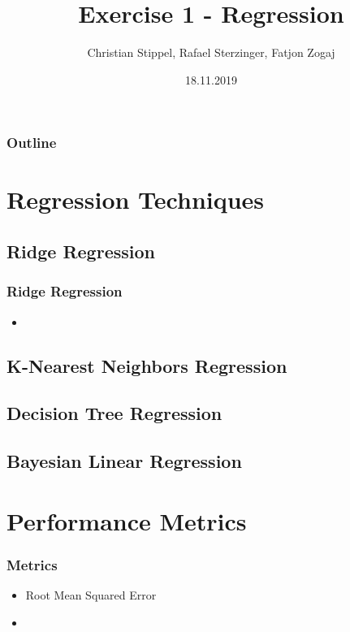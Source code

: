 \documentclass[aspectratio=169]{beamer}
\title[Your Short Title]{Exercise 1 - Regression}
\author{Christian Stippel, Rafael Sterzinger, Fatjon Zogaj}
\institute{Machine Learning}
\date{18.11.2019}
\begin{document}

\begin{frame}
  \titlepage
\end{frame}

\begin{frame}
\frametitle{Outline}
\tableofcontents
\end{frame}

\section{Regression Techniques}
\subsection{Ridge Regression}

\begin{frame}
\frametitle{Ridge Regression}
\begin{itemize}
\item 
\end{itemize}
\end{frame}

\subsection{K-Nearest Neighbors Regression}
\subsection{Decision Tree Regression}
\subsection{Bayesian Linear Regression}

\section{Performance Metrics}

\begin{frame}
\frametitle{Metrics}
\begin{itemize}
\item Root Mean Squared Error
\item 
\end{itemize}
\end{frame}
\end{document}
